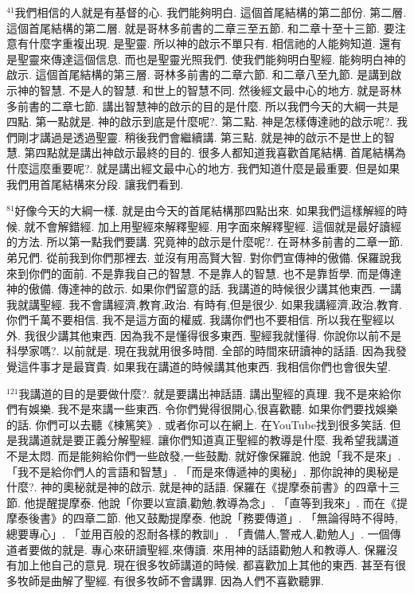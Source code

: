 \documentclass{book}
\begin{document}
$^{41}$我們相信的人就是有基督的心.
我們能夠明白.
這個首尾結構的第二部份.
第二層.
這個首尾結構的第二層.
就是哥林多前書的二章三至五節.
和二章十至十三節.
要注意有什麼字重複出現.
是聖靈.
所以神的啟示不單只有.
相信祂的人能夠知道.
還有是聖靈來傳達這個信息.
而也是聖靈光照我們.
使我們能夠明白聖經.
能夠明白神的啟示.
這個首尾結構的第三層.
哥林多前書的二章六節.
和二章八至九節.
是講到啟示神的智慧.
不是人的智慧.
和世上的智慧不同.
然後經文最中心的地方.
就是哥林多前書的二章七節.
講出智慧神的啟示的目的是什麼.
所以我們今天的大綱一共是四點.
第一點就是.
神的啟示到底是什麼呢?.
第二點.
神是怎樣傳達祂的啟示呢?.
我們剛才講過是透過聖靈.
稍後我們會繼續講.
第三點.
就是神的啟示不是世上的智慧.
第四點就是講出神啟示最終的目的.
很多人都知道我喜歡首尾結構.
首尾結構為什麼這麼重要呢?.
就是講出經文最中心的地方.
我們知道什麼是最重要.
但是如果我們用首尾結構來分段.
讓我們看到.

$^{81}$好像今天的大綱一樣.
就是由今天的首尾結構那四點出來.
如果我們這樣解經的時候.
就不會解錯經.
加上用聖經來解釋聖經.
用字面來解釋聖經.
這個就是最好讀經的方法.
所以第一點我們要講.
究竟神的啟示是什麼呢?.
在哥林多前書的二章一節.
弟兄們.
從前我到你們那裡去.
並沒有用高賢大智.
對你們宣傳神的傲備.
保羅說我來到你們的面前.
不是靠我自己的智慧.
不是靠人的智慧.
也不是靠哲學.
而是傳達神的傲備.
傳達神的啟示.
如果你們留意的話.
我講道的時候很少講其他東西.
一講我就講聖經.
我不會講經濟,教育,政治.
有時有,但是很少.
如果我講經濟,政治,教育.
你們千萬不要相信.
我不是這方面的權威.
我講你們也不要相信.
所以我在聖經以外.
我很少講其他東西.
因為我不是懂得很多東西.
聖經我就懂得.
你說你以前不是科學家嗎?.
以前就是.
現在我就用很多時間.
全部的時間來研讀神的話語.
因為我發覺這件事才是最寶貴.
如果我在講道的時候講其他東西.
我相信你們也會很失望.

$^{121}$我講道的目的是要做什麼?.
就是要講出神話語.
講出聖經的真理.
我不是來給你們有娛樂.
我不是來講一些東西.
令你們覺得很開心,很喜歡聽.
如果你們要找娛樂的話.
你們可以去聽《棟篤笑》.
或者你可以在網上.
在YouTube找到很多笑話.
但是我講道就是要正義分解聖經.
讓你們知道真正聖經的教導是什麼.
我希望我講道不是太悶.
而是能夠給你們一些啟發,一些鼓勵.
就好像保羅說.
他說「我不是來」.
「我不是給你們人的言語和智慧」.
「而是來傳遞神的奧秘」.
那你說神的奧秘是什麼?.
神的奧秘就是神的啟示.
就是神的話語.
保羅在《提摩泰前書》的四章十三節.
他提醒提摩泰.
他說「你要以宣讀,勸勉,教導為念」.
「直等到我來」.
而在《提摩泰後書》的四章二節.
他又鼓勵提摩泰.
他說「務要傳道」.
「無論得時不得時,總要專心」.
「並用百般的忍耐各樣的教訓」.
「責備人,警戒人,勸勉人」.
一個傳道者要做的就是.
專心來研讀聖經,來傳讀.
來用神的話語勸勉人和教導人.
保羅沒有加上他自己的意見.
現在很多牧師講道的時候.
都喜歡加上其他的東西.
甚至有很多牧師是曲解了聖經.
有很多牧師不會講罪.
因為人們不喜歡聽罪.
\end{document}
